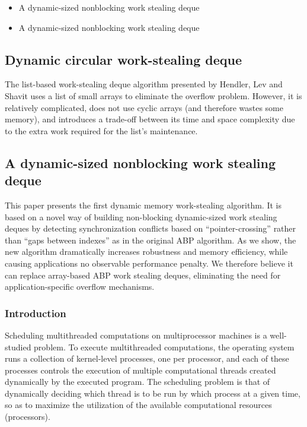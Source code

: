 
\begin{itemize}
\item A dynamic-sized nonblocking work stealing deque
  \cite{Hendler2006}
\item A dynamic-sized nonblocking work stealing deque
  \cite{Hendler2006a}
\end{itemize}

\subsection{Dynamic circular work-stealing deque \cite{Chase2005}}

The list-based work-stealing deque algorithm presented by Hendler, Lev
and Shavit \cite{Hendler2006, Hendler2006a} uses a list of small
arrays to eliminate the overflow problem. However, it is relatively
complicated, does not use cyclic arrays (and therefore wastes some
memory), and introduces a trade-off between its time and space
complexity due to the extra work required for the list's maintenance.

\subsection{A dynamic-sized nonblocking work stealing deque
  \cite{Hendler2006, Hendler2006a}}

This paper presents the first dynamic memory work-stealing
algorithm. It is based on a novel way of building non-blocking
dynamic-sized work stealing deques by detecting synchronization
conflicts based on ``pointer-crossing'' rather than ``gaps between
indexes'' as in the original ABP algorithm. As we show, the new
algorithm dramatically increases robustness and memory efficiency,
while causing applications no observable performance penalty. We
therefore believe it can replace array-based ABP work stealing deques,
eliminating the need for application-specific overflow mechanisms.

\subsubsection{Introduction}

Scheduling multithreaded computations on multiprocessor machines is a
well-studied problem. To execute multithreaded computations, the
operating system runs a collection of kernel-level processes, one per
processor, and each of these processes controls the execution of
multiple computational threads created dynamically by the executed
program. The scheduling problem is that of dynamically deciding which
thread is to be run by which process at a given time, so as to
maximize the utilization of the available computational resources
(processors).

